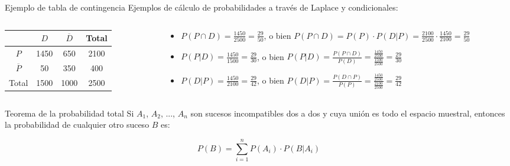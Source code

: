 \documentclass[11pt,handout]{beamer}
\begin{document}
\begin{frame}{Ejemplo de tabla de contingencia}
Ejemplos de cálculo de probabilidades a través de Laplace y condicionales:
\begin{columns}
\begin{column}{0.41\textwidth}
     \begin{tabular}{|c | c | c | c |} 
     \hline
      &  $D$ & $\overline{D}$ & Total \\ [0.5ex] 
     \hline
     $P$ & \color{red}1450 & \color{red}650 & 2100 \\ 
     \hline
     $\overline{P}$ & \color{red}50  & 350 & \color{red}400 \\
     \hline
     Total & 1500 & \color{red}1000 &  2500 \\
     \hline
    \end{tabular}
\end{column}
\begin{column}{0.65\textwidth}  
\begin{itemize}[<+->]
    \item $P(P \cap D)= \frac{1450}{2500}=\frac{29}{50}$, o bien $P(P \cap D)= P(P)\cdot P(D|P)=\frac{2100}{2500}\cdot \frac{1450}{2100}=\frac{29}{50}$
    \item $P(P|D)=\frac{1450}{1500}=\frac{29}{30}$, o bien $P(P|D)=\frac{P(P \cap D)}{P(D)} =\frac{\frac{1450}{2500}}{\frac{1500}{2500}}=\frac{29}{30}$
    \item $P(D|P)=\frac{1450}{2100}=\frac{29}{42}$, o bien $P(D|P)= \frac{P(D \cap P)}{P(P)} =\frac{\frac{1450}{2500}}{\frac{2100}{2500}}=\frac{29}{42}$
\end{itemize}
\end{column}
\end{columns}
\end{frame}

\begin{frame}{Teorema de la probabilidad total}
Si $A_1$, $A_2$, ..., $A_n$   son sucesos incompatibles dos a dos y cuya unión es todo el espacio muestral, entonces la probabilidad de cualquier otro suceso $B$ es:
\begin{block}{}
$$P(B)=\sum_{i=1}^n P(A_i)\cdot  P(B|A_i) $$
\end{block}

\end{frame}
\end{document}

